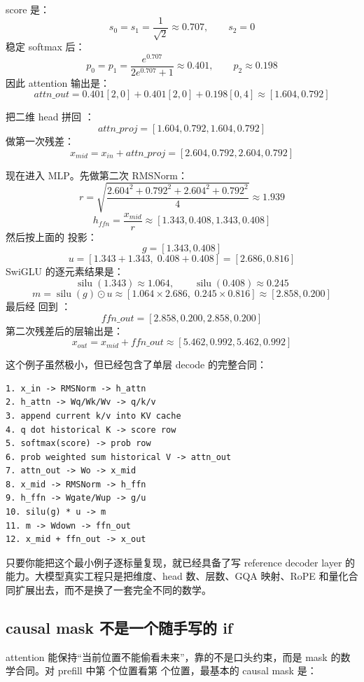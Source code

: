 score 是：
\[
s_0=s_1=\frac{1}{\sqrt{2}}\approx 0.707,\qquad s_2=0
\]
稳定 softmax 后：
\[
p_0=p_1=\frac{e^{0.707}}{2e^{0.707}+1}\approx 0.401,\qquad
p_2\approx 0.198
\]
因此 attention 输出是：
\[
attn\_out
=
0.401[2,0]+0.401[2,0]+0.198[0,4]
\approx
[1.604,0.792]
\]

 把二维 head 拼回 \code{[4]}：
\[
attn\_proj = [1.604,0.792,1.604,0.792]
\]
做第一次残差：
\[
x_{mid}=x_{in}+attn\_proj=[2.604,0.792,2.604,0.792]
\]

现在进入 MLP。先做第二次 RMSNorm：
\[
r=\sqrt{\frac{2.604^2+0.792^2+2.604^2+0.792^2}{4}}\approx 1.939
\]
\[
h_{ffn}=\frac{x_{mid}}{r}\approx[1.343,0.408,1.343,0.408]
\]
然后按上面的  投影：
\[
g=[1.343,0.408]
\]
\[
u=[1.343+1.343,\;0.408+0.408]=[2.686,0.816]
\]
SwiGLU 的逐元素结果是：
\[
\operatorname{silu}(1.343)\approx 1.064,\qquad
\operatorname{silu}(0.408)\approx 0.245
\]
\[
m=\operatorname{silu}(g)\odot u
\approx
[1.064\times 2.686,\;0.245\times 0.816]
\approx
[2.858,0.200]
\]
最后经  回到 \code{[4]}：
\[
ffn\_out=[2.858,0.200,2.858,0.200]
\]
第二次残差后的层输出是：
\[
x_{out}=x_{mid}+ffn\_out
\approx
[5.462,0.992,5.462,0.992]
\]

这个例子虽然极小，但已经包含了单层 decode 的完整合同：

\begin{lstlisting}[numbers=none,caption={最小 decoder block 的逐步账本}]
1. x_in -> RMSNorm -> h_attn
2. h_attn -> Wq/Wk/Wv -> q/k/v
3. append current k/v into KV cache
4. q dot historical K -> score row
5. softmax(score) -> prob row
6. prob weighted sum historical V -> attn_out
7. attn_out -> Wo -> x_mid
8. x_mid -> RMSNorm -> h_ffn
9. h_ffn -> Wgate/Wup -> g/u
10. silu(g) * u -> m
11. m -> Wdown -> ffn_out
12. x_mid + ffn_out -> x_out
\end{lstlisting}

\begin{keyidea}
只要你能把这个最小例子逐标量复现，就已经具备了写 reference decoder layer 的能力。大模型真实工程只是把维度、head 数、层数、GQA 映射、RoPE 和量化合同扩展出去，而不是换了一套完全不同的数学。
\end{keyidea}

\subsection{causal mask 不是一个随手写的 if}

attention 能保持“当前位置不能偷看未来”，靠的不是口头约束，而是 mask 的数学合同。对 prefill 中第  个位置看第  个位置，最基本的 causal mask 是：

